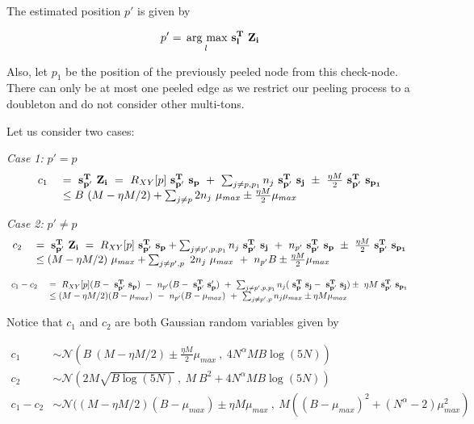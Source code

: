 The estimated position $p'$ is given by

\[ p' = \underset{l}{\operatorname*{\,arg\ max}}\ \bf s^T_l ~ Z_i\]

Also, let $p_1$ be the position of the previously peeled node from this check-node. There can only be at most one peeled edge as we restrict our peeling process to a doubleton and do not consider other multi-tons.
 
Let us consider two cases:

{\textit{Case 1:} $p' = p$}
\[
\begin{array}{ll}
c_1 \ &= \ \mathbf{s^T_{p'}} ~\mathbf{Z_i} \ = \ R_{XY}[p] {\bf ~s^T_{p'}~ s_p}\ + \ \sum_{j \neq p,p_1}n_j {\bf ~s^T_{p'}~ s_j} \ \pm \  \frac{\eta M}{2} {\bf ~s^T_{p'} ~ s_{p_1}} \\
&\leq B ~ (M-\eta M/2) +  \sum_{j \neq p} 2 n_j ~ \mu_{max} \pm \frac{\eta M}{2} \mu_{max}
\end{array} 
\]

{\textit{Case 2:} $p' \neq p$}
\[
\begin{array}{ll}
c_2 \ &= \ \mathbf{s^T_{p'}} ~\mathbf{Z_i}\ = \ R_{XY}[p]  {\bf ~s^T_{p'}~ s_p}+ \sum_{j \neq p',p,p_1}n_j{\bf ~s^T_{p'}~ s_j} \ + \ n_{p'} {\bf ~s^T_{p'}~ s_p} \ \pm \ \frac{\eta M}{2} {\bf ~s^T_{p'}~ s_{p_1}}\\
&\leq (M-\eta M/2) ~ \mu_{max} + \sum_{j \neq p',p} \ 2n_j ~ \mu_{max} \ + \ n_{p'} B \pm \frac{\eta M}{2} \mu_{max}
\end{array} 
\]

\[
\begin{array}{ll}
c_1 - c_2 \ &=  \ R_{XY}[p](B - {\bf ~s^T_{p'}~ s_p}) \ - \ n_{p'}(B - {\bf ~s^T_{p'}~ s_p'}) ~ + ~ \sum_{j \neq p',p,p_1}n_j ({\bf ~s^T_{p}~ s_j} - {\bf ~s^T_{p'}~ s_j})  \pm \  \eta M {\bf ~s^T_{p'} ~ s_{p_1}}  \\
&\leq (M-\eta M/2)(B-\mu_{max})  \ - \ n_{p'}(B - \mu_{max}) ~ + ~ \sum_{j \neq p',p}n_j \mu_{max} \pm \eta M \mu_{max}\\
\end{array} 
\]


Notice that $c_1$ and $c_2$ are both Gaussian random variables given by

\[ \begin{array}{ll}
c_1 &\sim  \mathcal{N}(B ~ (M-\eta M/2) \pm \frac{\eta M}{2} \mu_{max} \ , \ 4N^\alpha M B \log(5N)) \\
c_2 &\sim  \mathcal{N}(2M \sqrt{B\log(5N)}\ , \ M~B^2 + 4N^\alpha M B \log(5N))\\
c_1 - c_2 &\sim  \mathcal{N}((M-\eta M/2)(B-\mu_{max}) \pm \eta M \mu_{max} \ , \ M((B-\mu_{max})^2 + (N^{\alpha}-2)\mu_{max}^2)
\end{array}\]

